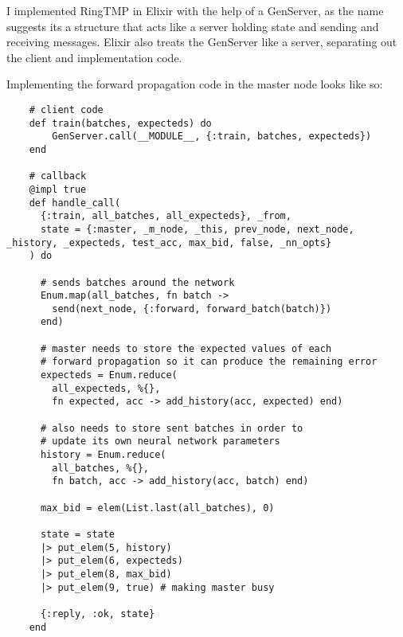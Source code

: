 I implemented RingTMP in Elixir with the help of a GenServer, as the name
suggests its a structure that acts like a server holding state and sending and
receiving messages. Elixir also treats the GenServer like a server, separating
out the client and implementation code.


Implementing the forward propagation
code in the master node looks like so:
\begin{lstlisting}
    # client code
    def train(batches, expecteds) do
        GenServer.call(__MODULE__, {:train, batches, expecteds})
    end

    # callback
    @impl true
    def handle_call(
      {:train, all_batches, all_expecteds}, _from,
      state = {:master, _m_node, _this, prev_node, next_node, _history, _expecteds, test_acc, max_bid, false, _nn_opts}
    ) do

      # sends batches around the network
      Enum.map(all_batches, fn batch ->
        send(next_node, {:forward, forward_batch(batch)})
      end)

      # master needs to store the expected values of each
      # forward propagation so it can produce the remaining error
      expecteds = Enum.reduce(
        all_expecteds, %{},
        fn expected, acc -> add_history(acc, expected) end)

      # also needs to store sent batches in order to
      # update its own neural network parameters
      history = Enum.reduce(
        all_batches, %{},
        fn batch, acc -> add_history(acc, batch) end)

      max_bid = elem(List.last(all_batches), 0)

      state = state
      |> put_elem(5, history)
      |> put_elem(6, expecteds)
      |> put_elem(8, max_bid)
      |> put_elem(9, true) # making master busy

      {:reply, :ok, state}
    end
\end{lstlisting}











